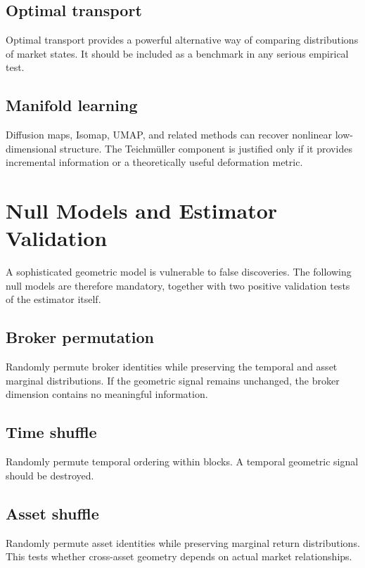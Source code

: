 \documentclass[11pt,a4paper]{article}
\numberwithin{equation}{section}
\begin{document}
\subsection{Optimal transport}
Optimal transport provides a powerful alternative way of comparing
distributions of market states. It should be included as a benchmark
in any serious empirical test.

\subsection{Manifold learning}
Diffusion maps, Isomap, UMAP, and related methods can recover
nonlinear low-dimensional structure. The Teichmüller component is
justified only if it provides incremental information or a
theoretically useful deformation metric.

\section{Null Models and Estimator Validation}

A sophisticated geometric model is vulnerable to false discoveries.
The following null models are therefore mandatory, together with two
positive validation tests of the estimator itself.

\subsection{Broker permutation}
Randomly permute broker identities while preserving the temporal and
asset marginal distributions. If the geometric signal remains
unchanged, the broker dimension contains no meaningful information.

\subsection{Time shuffle}
Randomly permute temporal ordering within blocks. A temporal
geometric signal should be destroyed.

\subsection{Asset shuffle}
Randomly permute asset identities while preserving marginal return
distributions. This tests whether cross-asset geometry depends on
actual market relationships.
\end{document}
